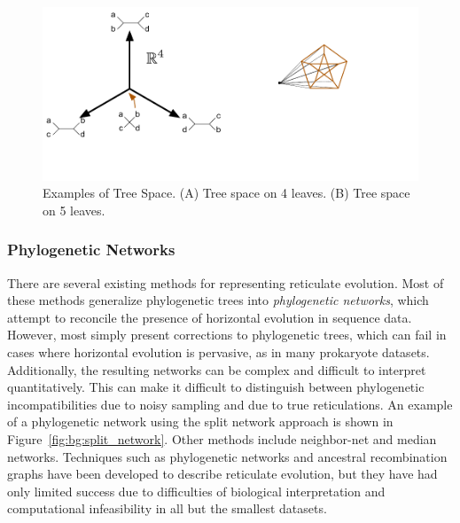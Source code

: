 \begin{figure}
\centering
\includegraphics[]{fig/background/tree_space.pdf}
\caption[Tree Space]{Examples of Tree Space. (A) Tree space on 4 leaves. (B) Tree space on 5 leaves.}
\label{fig:bg:tree_space}
\end{figure}

\subsubsection{Phylogenetic Networks}
\label{bg:bio:phylo:networks}

There are several existing methods for representing reticulate evolution.
Most of these methods generalize phylogenetic trees into \emph{phylogenetic networks}, which attempt to reconcile the presence of horizontal evolution in sequence data.
However, most simply present corrections to phylogenetic trees, which can fail in cases where horizontal evolution is pervasive, as in many prokaryote datasets.
Additionally, the resulting networks can be complex and difficult to interpret quantitatively.
This can make it difficult to distinguish between phylogenetic incompatibilities due to noisy sampling and due to true reticulations.
An example of a phylogenetic network using the split network approach is shown in Figure~\ref{fig:bg:split_network}.
Other methods include neighbor-net and median networks.
Techniques such as phylogenetic networks and ancestral recombination graphs have been developed to describe reticulate evolution, but they have had only limited success due to difficulties of biological interpretation and computational infeasibility in all but the smallest datasets.

